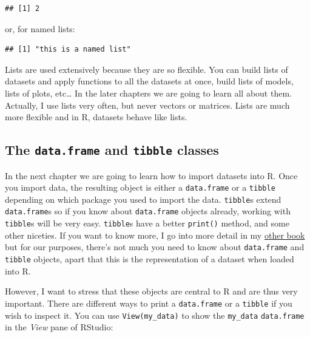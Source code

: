 \documentclass[]{gitbook}
\newenvironment{Shaded}{\begin{snugshade}}{\end{snugshade}}
\newcommand{\NormalTok}[1]{#1}
\newcommand{\OperatorTok}[1]{\textcolor[rgb]{0.81,0.36,0.00}{\textbf{#1}}}
\theoremstyle{definition}
\theoremstyle{definition}
\theoremstyle{definition}
\theoremstyle{remark}
\begin{document}
\begin{verbatim}
## [1] 2
\end{verbatim}

or, for named lists:

\begin{Shaded}
\end{Shaded}

\begin{verbatim}
## [1] "this is a named list"
\end{verbatim}

Lists are used extensively because they are so flexible. You can build
lists of datasets and apply functions to all the datasets at once, build
lists of models, lists of plots, etc\ldots{} In the later chapters we
are going to learn all about them. Actually, I use lists very often, but
never vectors or matrices. Lists are much more flexible and in R,
datasets behave like lists.

\hypertarget{the-data.frame-and-tibble-classes}{%
\subsection{\texorpdfstring{The \texttt{data.frame} and \texttt{tibble}
classes}{The data.frame and tibble classes}}\label{the-data.frame-and-tibble-classes}}

In the next chapter we are going to learn how to import datasets into R.
Once you import data, the resulting object is either a
\texttt{data.frame} or a \texttt{tibble} depending on which package you
used to import the data. \texttt{tibble}s extend \texttt{data.frame}s so
if you know about \texttt{data.frame} objects already, working with
\texttt{tibble}s will be very easy. \texttt{tibble}s have a better
\texttt{print()} method, and some other niceties. If you want to know
more, I go into more detail in my
\href{https://b-rodrigues.github.io/fput/tidyverse.html\#getting-data-into-r-with-readr-readxl-haven-and-what-are-tibbles}{other
book} but for our purposes, there's not much you need to know about
\texttt{data.frame} and \texttt{tibble} objects, apart that this is the
representation of a dataset when loaded into R.

However, I want to stress that these objects are central to R and are
thus very important. There are different ways to print a
\texttt{data.frame} or a \texttt{tibble} if you wish to inspect it. You
can use \texttt{View(my\_data)} to show the \texttt{my\_data}
\texttt{data.frame} in the \emph{View} pane of RStudio:
\end{document}
